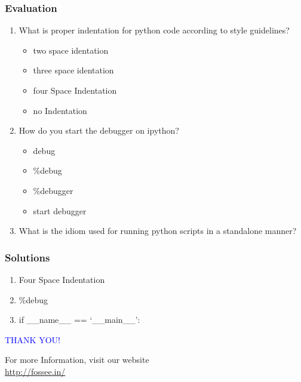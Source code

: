 \documentclass[presentation]{beamer}
\begin{document}
\begin{frame}
\frametitle{Evaluation}
\label{sec-18}


\begin{enumerate}
\item What is proper indentation for python code according to style guidelines?
\begin{itemize}
\item two space identation
\item three space identation
\item four Space Indentation
\item no Indentation
\end{itemize}
\vspace{3pt}
\item How do you start the debugger on ipython?
\begin{itemize}
\item debug
\item \%debug
\item \%debugger
\item start debugger
\end{itemize}
\vspace{3pt}
\item What is the idiom used for running python scripts in a standalone manner?
\end{enumerate}
\end{frame}
\begin{frame}
\frametitle{Solutions}
\label{sec-19}


\begin{enumerate}
\item Four Space Indentation
\vspace{12pt}
\item \%debug
\vspace{12pt}
\item if \_\_name\_\_ == `\_\_main\_\_':
\end{enumerate}
\end{frame}
\begin{frame}

  \begin{block}{}
  \begin{center}
  \textcolor{blue}{\Large THANK YOU!} 
  \end{center}
  \end{block}
\begin{block}{}
  \begin{center}
    For more Information, visit our website\\
    \url{http://fossee.in/}
  \end{center}  
  \end{block}
\end{frame}
\end{document}
